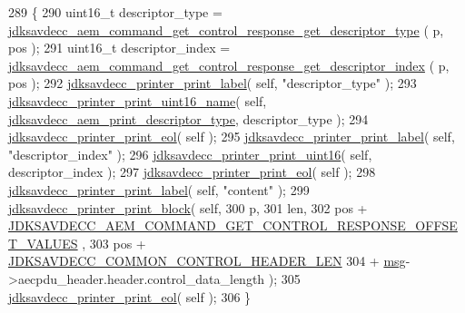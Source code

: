 \begin{DoxyCode}
289 \{
290     uint16\_t descriptor\_type = 
      \hyperlink{group__command__get__control__response_ga720cf2ab5dbadf7fd892d6c8d63e6db0}{jdksavdecc\_aem\_command\_get\_control\_response\_get\_descriptor\_type}
      ( p, pos );
291     uint16\_t descriptor\_index = 
      \hyperlink{group__command__get__control__response_ga7d564a31c9f9ba8d81b13d2f4e3c09e9}{jdksavdecc\_aem\_command\_get\_control\_response\_get\_descriptor\_index}
      ( p, pos );
292     \hyperlink{group__util_gaf7818b24143b3c7502926a425a242ff5}{jdksavdecc\_printer\_print\_label}( \textcolor{keyword}{self}, \textcolor{stringliteral}{"descriptor\_type"} );
293     \hyperlink{group__util_ga62486d864a66773d19bbbe23cebf346a}{jdksavdecc\_printer\_print\_uint16\_name}( \textcolor{keyword}{self}, 
      \hyperlink{group__aem__print_gabb4f27bdad61aeaf875d91f408b7199d}{jdksavdecc\_aem\_print\_descriptor\_type}, descriptor\_type );
294     \hyperlink{group__util_gacda56c9d3d24593a52c999682fa6e6e3}{jdksavdecc\_printer\_print\_eol}( \textcolor{keyword}{self} );
295     \hyperlink{group__util_gaf7818b24143b3c7502926a425a242ff5}{jdksavdecc\_printer\_print\_label}( \textcolor{keyword}{self}, \textcolor{stringliteral}{"descriptor\_index"} );
296     \hyperlink{group__util_ga9793e0ff8e7ed25d957282ee6b257ce2}{jdksavdecc\_printer\_print\_uint16}( \textcolor{keyword}{self}, descriptor\_index );
297     \hyperlink{group__util_gacda56c9d3d24593a52c999682fa6e6e3}{jdksavdecc\_printer\_print\_eol}( \textcolor{keyword}{self} );
298     \hyperlink{group__util_gaf7818b24143b3c7502926a425a242ff5}{jdksavdecc\_printer\_print\_label}( \textcolor{keyword}{self}, \textcolor{stringliteral}{"content"} );
299     \hyperlink{group__util_ga18d7b11e396f21996dedde77febcb22f}{jdksavdecc\_printer\_print\_block}( \textcolor{keyword}{self},
300                                     p,
301                                     len,
302                                     pos + 
      \hyperlink{group__command__get__control__response_gad5260aafd875b20d7705f8cca7387cd6}{JDKSAVDECC\_AEM\_COMMAND\_GET\_CONTROL\_RESPONSE\_OFFSET\_VALUES}
      ,
303                                     pos + \hyperlink{group__jdksavdecc__avtp__common__control__header_gaae84052886fb1bb42f3bc5f85b741dff}{JDKSAVDECC\_COMMON\_CONTROL\_HEADER\_LEN}
304                                     + \hyperlink{maap__log__linux_8c_a0c7e58a50354c4a4d6dad428d0e47029}{msg}->aecpdu\_header.header.control\_data\_length );
305     \hyperlink{group__util_gacda56c9d3d24593a52c999682fa6e6e3}{jdksavdecc\_printer\_print\_eol}( \textcolor{keyword}{self} );
306 \}
\end{DoxyCode}


